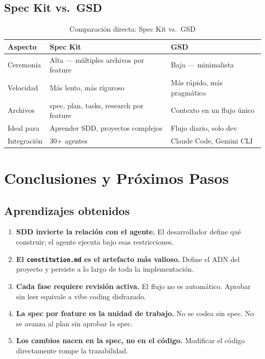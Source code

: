 \documentclass[12pt, a4paper]{report}
\begin{document}
\section{Spec Kit vs.\ GSD}

\begin{table}[H]
\centering
\begin{tabularx}{\textwidth}{lXX}
\toprule
\textbf{Aspecto} & \textbf{Spec Kit} & \textbf{GSD} \\
\midrule
Ceremonia    & Alta --- m\'ultiples archivos por feature & Baja --- minimalista \\
Velocidad    & M\'as lento, m\'as riguroso & M\'as r\'apido, m\'as pragm\'atico \\
Archivos     & spec, plan, tasks, research por feature & Contexto en un flujo \'unico \\
Ideal para   & Aprender SDD, proyectos complejos & Flujo diario, solo dev \\
Integraci\'on & 30+ agentes & Claude Code, Gemini CLI \\
\bottomrule
\end{tabularx}
\caption{Comparaci\'on directa: Spec Kit vs.\ GSD}
\end{table}

\chapter{Conclusiones y Pr\'oximos Pasos}

\section{Aprendizajes obtenidos}

\begin{enumerate}[leftmargin=*, label=\arabic{*}.]
  \item \textbf{SDD invierte la relaci\'on con el agente.} El desarrollador
        define qu\'e construir; el agente ejecuta bajo esas restricciones.
  \item \textbf{El \texttt{constitution.md} es el artefacto m\'as valioso.}
        Define el ADN del proyecto y persiste a lo largo de toda la
        implementaci\'on.
  \item \textbf{Cada fase requiere revisi\'on activa.} El flujo no es
        autom\'atico. Aprobar sin leer equivale a vibe coding disfrazado.
  \item \textbf{La spec por feature es la unidad de trabajo.} No se codea
        sin spec. No se avanza al plan sin aprobar la spec.
  \item \textbf{Los cambios nacen en la spec, no en el c\'odigo.}
        Modificar el c\'odigo directamente rompe la trazabilidad.
\end{enumerate}
\end{document}
